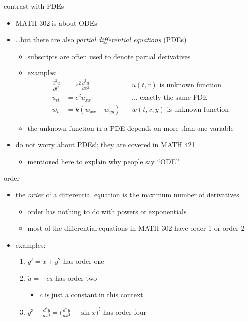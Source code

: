 \documentclass{beamer}
\begin{document}
\begin{frame}{contrast with PDEs}

\begin{itemize}
\item MATH 302 is about ODEs
\item \dots but there are also \emph{partial differential equations} (PDEs)
    \begin{itemize}
    \item subscripts are often used to denote partial derivatives
    \item examples:
\begin{align*}
\frac{\partial^2 u}{\partial t^2} &= c^2 \frac{\partial^2 u}{\partial x^2} && u(t,x) \text{ is unknown function} \\
u_{tt} &= c^2 u_{xx} && \dots \text{ exactly the same PDE} \\
w_t &= k(w_{xx} + w_{yy}) && w(t,x,y) \text{ is unknown function}
\end{align*}
    \item the unknown function in a PDE depends on more than one variable
    \end{itemize}
\item do not worry about PDEs!; they are covered in MATH 421
    \begin{itemize}
    \item mentioned here to explain why people say ``ODE''
    \end{itemize}
\end{itemize}
\end{frame}

\begin{frame}{order}

\begin{itemize}
\item the \emph{order} of a differential equation is the maximum number of derivatives
    \begin{itemize}
    \item order has nothing to do with powers or exponentials
    \item most of the differential equations in MATH 302 have order 1 or order 2
    \end{itemize}
\item examples:
    \begin{enumerate}
    \item $y' = x + y^2$ has order one
    \item $\ddot u = - c u$ has order two
        \begin{itemize}
        \item $c$ is just a constant in this context
        \end{itemize}
    \item $y^3 + \frac{d^4 y}{dx^4} = \big(\frac{d^2 y}{dx^2} + \sin x\big)^5$ has order four
    \end{enumerate}
\end{itemize}
\end{frame}
\end{document}
